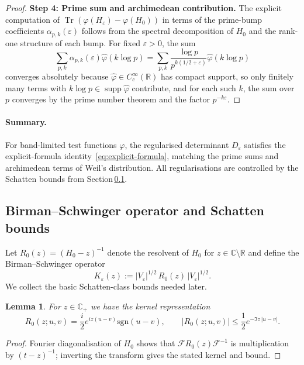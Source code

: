 ﻿\documentclass[12pt,a4paper]{article}
\newtheorem{lemma}[theorem]{Lemma}
\theoremstyle{definition}
\theoremstyle{remark}
\newcommand{\CC}{\mathbb{C}}
\newcommand{\RR}{\mathbb{R}}
\newcommand{\Tr}{\operatorname{Tr}}
\newcommand{\supp}{\operatorname{supp}}
\newcommand{\F}{\mathcal{F}}
\begin{document}
\begin{proof}
\textbf{Step 4: Prime sum and archimedean contribution.}
The explicit computation of $\Tr(\varphi(H_\varepsilon) - \varphi(H_0))$ in terms of the prime-bump coefficients $\alpha_{p,k}(\varepsilon)$ follows from the spectral decomposition of $H_0$ and the rank-one structure of each bump. For fixed $\varepsilon > 0$, the sum
\[
  \sum_{p,k} \alpha_{p,k}(\varepsilon) \widehat{\varphi}(k \log p) = \sum_{p,k} \frac{\log p}{p^{k(1/2+\varepsilon)}} \widehat{\varphi}(k \log p)
\]
converges absolutely because $\widehat{\varphi} \in C_c^\infty(\RR)$ has compact support, so only finitely many terms with $k \log p \in \supp \widehat{\varphi}$ contribute, and for each such $k$, the sum over $p$ converges by the prime number theorem and the factor $p^{-k\varepsilon}$.
\end{proof}

\paragraph{Summary.}
For band-limited test functions $\varphi$, the regularised determinant $D_\varepsilon$ satisfies the explicit-formula identity~\eqref{eq:explicit-formula}, matching the prime sums and archimedean terms of Weil's distribution.  All regularisations are controlled by the Schatten bounds from Section\,\ref{subsec:BS-operator}.

\subsection{Birman--Schwinger operator and Schatten bounds}
\label{subsec:BS-operator}
Let $R_0(z)=(H_0-z)^{-1}$ denote the resolvent of $H_0$ for $z\in\CC\setminus\RR$ and define the Birman--Schwinger operator
\begin{equation}
  K_\varepsilon(z)
  := |V_\varepsilon|^{1/2}\, R_0(z)\, |V_\varepsilon|^{1/2}.
  \label{eq:BS-def}
\end{equation}
We collect the basic Schatten-class bounds needed later.

\begin{lemma}\label{lem:R0-kernel}
For $z\in\CC_+$ we have the kernel representation
\begin{equation}
  R_0(z;u,v)=\frac{i}{2} e^{iz(u-v)} \mathrm{sgn}(u-v),
  \qquad |R_0(z;u,v)|\le \frac{1}{2} e^{-\Im z\,|u-v|}.
\end{equation}
\end{lemma}

\begin{proof}
Fourier diagonalisation of $H_0$ shows that $\F R_0(z)\F^{-1}$ is multiplication by $(t-z)^{-1}$; inverting the transform gives the stated kernel and bound.
\end{proof}
\end{document}
